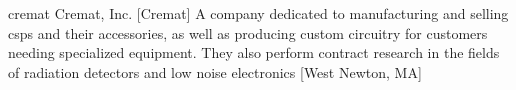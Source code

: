 \newglsXcompany%
{cremat}%
{Cremat, Inc.}%
[Cremat]%
{A company dedicated to manufacturing and selling \glspl{csp} and their accessories, as well as producing custom circuitry for customers needing specialized equipment. They also perform contract research in the fields of radiation detectors and low noise electronics \cite{website:Cremat}}%
[West Newton, MA]%
